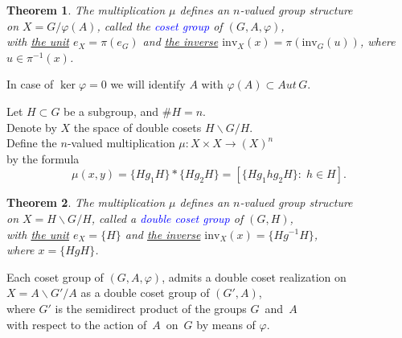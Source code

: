 \documentclass{beamer}
\newtheorem{thm}{Theorem}
\def\blue#1{\textcolor{blue}{#1}}
\begin{document}
\begin{frame}{}
\begin{thm}
The multiplication $\mu $ defines an $n$-valued group structure\\
on $X=G/\varphi(A)$, called the \blue{coset group} of  $(G,A,\varphi)$,\\
with \underline{the unit} $e_X=\pi(e_G)$ and \underline{the inverse} $\mathrm{inv}_{X}(x)=\pi(\mathrm{inv}_{G}(u))$, where
$u\in\pi^{-1}(x)$.
\end{thm}
In case of $\ker \varphi = 0$ we will identify $A$ with $\varphi(A)
\subset Aut\, G$.
\vspace{0.2cm}

Let $H \subset G$ be a subgroup, and $\#H=n$.\\[3pt]
Denote by $X$ the space of double cosets $H \backslash G/H$.\\[3pt]
Define the $n$-valued multiplication\; $\mu\colon X\times X\to (X)^n$\\
by the formula
\[
\mu(x,y)=\{Hg_1H\}*\{Hg_2H\} = [\{Hg_1hg_2H\} : \; h \in H].
\]
\end{frame}





\begin{frame}{}
\begin{thm}
The multiplication $\mu $ defines an $n$-valued group structure\\
on $X=H \backslash G/H$, called a \blue{double coset group} of $(G,H)$,\\
with \underline{the unit} $e_X=\{H\}$ and \underline{the inverse} $\mathrm{inv}_{X}(x)=\{Hg^{-1}H\}$,\\ where $x=\{HgH\}$.
\end{thm}
Each coset group of $(G,A,\varphi)$, admits a double coset realization on $X=A \backslash G'/A$ as a double
coset group of $(G',A)$,\\ where $G'$ is the semidirect product of the groups $G$\, and\, $A$\\ with respect to the action of~$A$\, on\, $G$\; by means of $\varphi$.
\end{frame}
\end{document}
